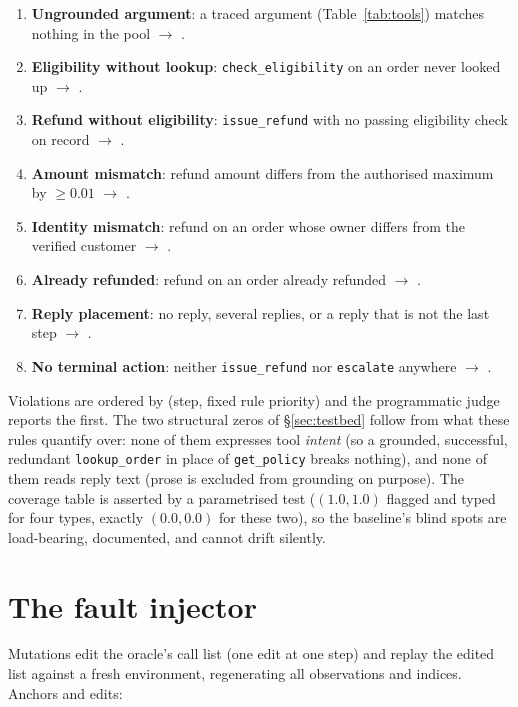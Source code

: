\begin{enumerate}\small
\item \textbf{Ungrounded argument}: a traced argument (Table~\ref{tab:tools}) matches nothing
  in the pool $\to$ .
\item \textbf{Eligibility without lookup}: \texttt{check\_eligibility} on an order never
  looked up $\to$ .
\item \textbf{Refund without eligibility}: \texttt{issue\_refund} with no passing eligibility
  check on record $\to$ .
\item \textbf{Amount mismatch}: refund amount differs from the authorised maximum by
  $\geq 0.01$ $\to$ .
\item \textbf{Identity mismatch}: refund on an order whose owner differs from the verified
  customer $\to$ .
\item \textbf{Already refunded}: refund on an order already refunded $\to$
  .
\item \textbf{Reply placement}: no reply, several replies, or a reply that is not the last
  step $\to$ .
\item \textbf{No terminal action}: neither \texttt{issue\_refund} nor \texttt{escalate}
  anywhere $\to$ .
\end{enumerate}

Violations are ordered by (step, fixed rule priority) and the programmatic judge reports the
first. The two structural zeros of \S\ref{sec:testbed} follow from what these rules quantify
over: none of them expresses tool \emph{intent} (so a grounded, successful, redundant
\texttt{lookup\_order} in place of \texttt{get\_policy} breaks nothing), and none of them
reads reply text (prose is excluded from grounding on purpose). The coverage
table is asserted by a parametrised test ($(1.0, 1.0)$ flagged and typed for four types,
exactly $(0.0, 0.0)$ for these two), so the baseline's blind spots are load-bearing,
documented, and cannot drift silently.

\section{The fault injector}
\label{app:injector}

Mutations edit the oracle's call list (one edit at one step) and replay the edited list
against a fresh environment, regenerating all observations and indices. Anchors and edits:

